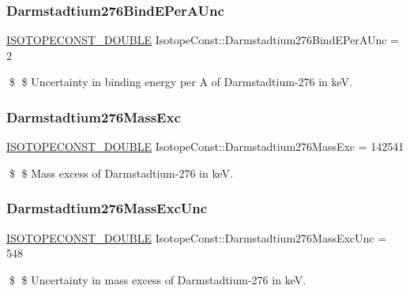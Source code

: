 \subsubsection{\texorpdfstring{Darmstadtium276\+Bind\+E\+Per\+A\+Unc}{Darmstadtium276BindEPerAUnc}}
{\footnotesize\ttfamily \mbox{\hyperlink{group___isotope_const-_macros_ga8f45a7272ce02c0b4c65c44636ed719a}{I\+S\+O\+T\+O\+P\+E\+C\+O\+N\+S\+T\+\_\+\+D\+O\+U\+B\+LE}} Isotope\+Const\+::\+Darmstadtium276\+Bind\+E\+Per\+A\+Unc = 2}

\$ \$ Uncertainty in binding energy per A of Darmstadtium-\/276 in keV. \mbox{\label{group___isotope_const-_darmstadtium-_ds276_ga7c1b5e318caa1e0d24a7577b2046dac1}} 
\subsubsection{\texorpdfstring{Darmstadtium276\+Mass\+Exc}{Darmstadtium276MassExc}}
{\footnotesize\ttfamily \mbox{\hyperlink{group___isotope_const-_macros_ga8f45a7272ce02c0b4c65c44636ed719a}{I\+S\+O\+T\+O\+P\+E\+C\+O\+N\+S\+T\+\_\+\+D\+O\+U\+B\+LE}} Isotope\+Const\+::\+Darmstadtium276\+Mass\+Exc = 142541}

\$ \$ Mass excess of Darmstadtium-\/276 in keV. \mbox{\label{group___isotope_const-_darmstadtium-_ds276_gaa82d6e3fd97aec49e4851a6a5ae0f102}} 
\subsubsection{\texorpdfstring{Darmstadtium276\+Mass\+Exc\+Unc}{Darmstadtium276MassExcUnc}}
{\footnotesize\ttfamily \mbox{\hyperlink{group___isotope_const-_macros_ga8f45a7272ce02c0b4c65c44636ed719a}{I\+S\+O\+T\+O\+P\+E\+C\+O\+N\+S\+T\+\_\+\+D\+O\+U\+B\+LE}} Isotope\+Const\+::\+Darmstadtium276\+Mass\+Exc\+Unc = 548}

\$ \$ Uncertainty in mass excess of Darmstadtium-\/276 in keV. \mbox{\label{group___isotope_const-_darmstadtium-_ds276_ga43988ecb7b1f4e6913c2fed5cb43d891}} 
